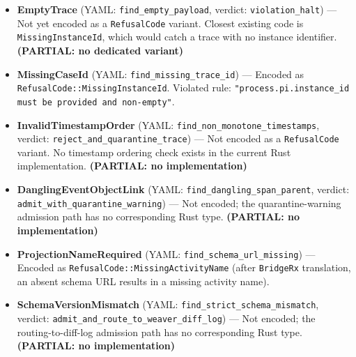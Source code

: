 \begin{itemize}
  \item \textbf{EmptyTrace} (YAML: \texttt{find\_empty\_payload}, verdict:
        \texttt{violation\_halt}) --- Not yet encoded as a \texttt{RefusalCode} variant.
        Closest existing code is \texttt{MissingInstanceId}, which would catch a trace
        with no instance identifier. \textbf{(PARTIAL: no dedicated variant)}
  \item \textbf{MissingCaseId} (YAML: \texttt{find\_missing\_trace\_id}) --- Encoded
        as \texttt{RefusalCode::MissingInstanceId}. Violated rule:
        \texttt{"process.pi.instance\_id must be provided and non-empty"}.
  \item \textbf{InvalidTimestampOrder} (YAML: \texttt{find\_non\_monotone\_timestamps},
        verdict: \texttt{reject\_and\_quarantine\_trace}) --- Not encoded as a
        \texttt{RefusalCode} variant. No timestamp ordering check exists in the
        current Rust implementation. \textbf{(PARTIAL: no implementation)}
  \item \textbf{DanglingEventObjectLink} (YAML: \texttt{find\_dangling\_span\_parent},
        verdict: \texttt{admit\_with\_quarantine\_warning}) --- Not encoded; the
        quarantine-warning admission path has no corresponding Rust type.
        \textbf{(PARTIAL: no implementation)}
  \item \textbf{ProjectionNameRequired} (YAML: \texttt{find\_schema\_url\_missing}) ---
        Encoded as \texttt{RefusalCode::MissingActivityName} (after \texttt{BridgeRx}
        translation, an absent schema URL results in a missing activity name).
  \item \textbf{SchemaVersionMismatch} (YAML: \texttt{find\_strict\_schema\_mismatch},
        verdict: \texttt{admit\_and\_route\_to\_weaver\_diff\_log}) --- Not encoded;
        the routing-to-diff-log admission path has no corresponding Rust type.
        \textbf{(PARTIAL: no implementation)}
\end{itemize}

